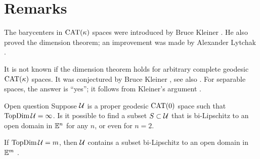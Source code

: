 \section{Remarks}

The barycenters in $\mathrm{CAT}(\kappa)$ spaces were introduced by Bruce Kleiner \cite{kleiner}.
He also proved the dimension theorem; an improvement was made by Alexander Lytchak \cite{lytchak:diff}.

It is not known if the dimension theorem holds for arbitrary complete geodesic $\mathrm{CAT}(\kappa)$ spaces.
It was conjectured by Bruce Kleiner \cite{kleiner}, see also \cite[p.~133]{gromov:asymt-inv}.
For separable spaces, the answer is ``yes'';
it follows from Kleiner's argument \cite[Corollary 14.13]{alexander-kapovitch-petrunin-2025}.

\begin{thm}{Open question}
Suppose $\mathcal{U}$ is a proper geodesic $\mathrm{CAT}(0)$ space such that $\mathop{\rm TopDim}\nolimits \mathcal{U}=\infty$.
Is it possible to find a subset $S\subset \mathcal{U}$ that is bi-Lipschitz to an open domain in $\mathbb{E}^n$ for any $n$, or even for $n=2$.
\end{thm}

If $\mathop{\rm TopDim}\nolimits \mathcal{U}=m$, then $\mathcal{U}$ contains a subset bi-Lipschitz to an open domain in $\mathbb{E}^m$ \cite[Theorem 14.15.]{alexander-kapovitch-petrunin-2025}.



